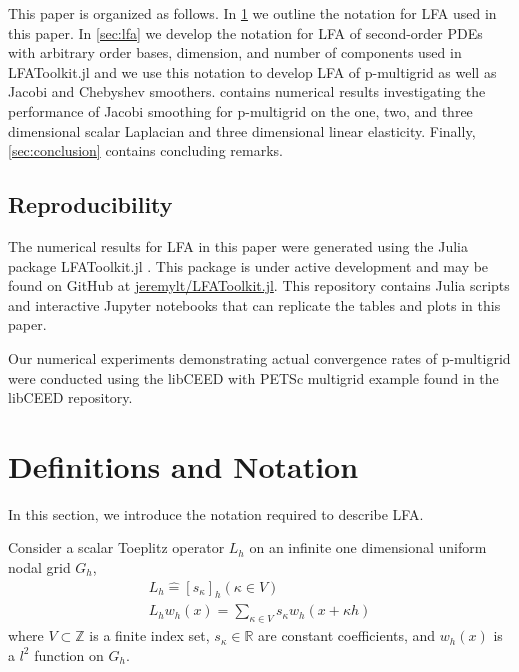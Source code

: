 \documentclass[review]{siamart190516}
\begin{document}
This paper is organized as follows.
In \cref{sec:notation} we outline the notation for LFA used in this paper.
In \cref{sec:lfa} we develop the notation for LFA of second-order PDEs with arbitrary order bases, dimension, and number of components used in LFAToolkit.jl and we use this notation to develop LFA of p-multigrid as well as Jacobi and Chebyshev smoothers.
 contains numerical results investigating the performance of Jacobi smoothing for p-multigrid on the one, two, and three dimensional scalar Laplacian and three dimensional linear elasticity.
Finally, \cref{sec:conclusion} contains concluding remarks.

\subsection{Reproducibility}\label{sec:reproducibility}

The numerical results for LFA in this paper were generated using the Julia package LFAToolkit.jl \cite{thompson2021toolkit}.
This package is under active development and may be found on GitHub at \href{https://github.com/jeremylt/LFAToolkit.jl}{jeremylt/LFAToolkit.jl}.
This repository contains Julia scripts and interactive Jupyter notebooks that can replicate the tables and plots in this paper.

Our numerical experiments demonstrating actual convergence rates of p-multigrid were conducted using the libCEED \cite{libceed-user-manual} with PETSc \cite{petsc-user-ref} multigrid example found in the libCEED repository.

\section{Definitions and Notation}\label{sec:notation}

In this section, we introduce the notation required to describe LFA.

Consider a scalar Toeplitz operator $L_h$ on an infinite one dimensional uniform nodal grid $G_h$,
\begin{equation}
\begin{split}
L_h \mathrel{\hat{=}} \left[ s_\kappa \right]_h \left( \kappa \in V \right)\\
L_h w_h \left( x \right) = \sum_{\kappa \in V} s_\kappa w_h \left( x + \kappa h \right)
\end{split}
\end{equation}
where $V \subset \mathbb{Z}$ is a finite index set, $s_\kappa \in \mathbb{R}$ are constant coefficients, and $w_h \left( x \right)$ is a $l^2$ function on $G_h$.
\end{document}
